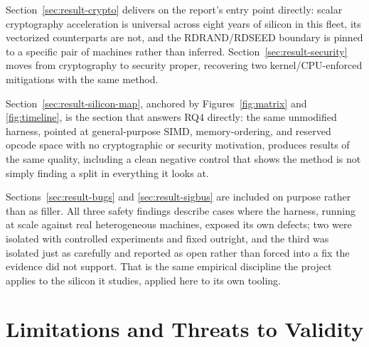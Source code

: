 \documentclass[11pt]{article}
\begin{document}
Section~\ref{sec:result-crypto} delivers on the report's entry point
directly: scalar cryptography acceleration is universal across eight
years of silicon in this fleet, its vectorized counterparts are not,
and the RDRAND/RDSEED boundary is pinned to a specific pair of machines
rather than inferred. Section~\ref{sec:result-security} moves from
cryptography to security proper, recovering two kernel/CPU-enforced
mitigations with the same method.

Section~\ref{sec:result-silicon-map}, anchored by Figures~\ref{fig:matrix}
and \ref{fig:timeline}, is the section that answers RQ4 directly: the
same unmodified harness, pointed at general-purpose SIMD,
memory-ordering, and reserved opcode space with no cryptographic or
security motivation, produces results of the same quality, including a
clean negative control that shows the method is not simply finding a
split in everything it looks at.

Sections~\ref{sec:result-bugs} and \ref{sec:result-sigbus} are included
on purpose rather than as filler. All three safety findings describe
cases where the harness, running at scale against real heterogeneous
machines, exposed its own defects; two were isolated with controlled
experiments and fixed outright, and the third was isolated just as
carefully and reported as open rather than forced into a fix the
evidence did not support. That is the same empirical discipline the
project applies to the silicon it studies, applied here to its own
tooling.

\section{Limitations and Threats to Validity}
\label{sec:limitations}
\end{document}
